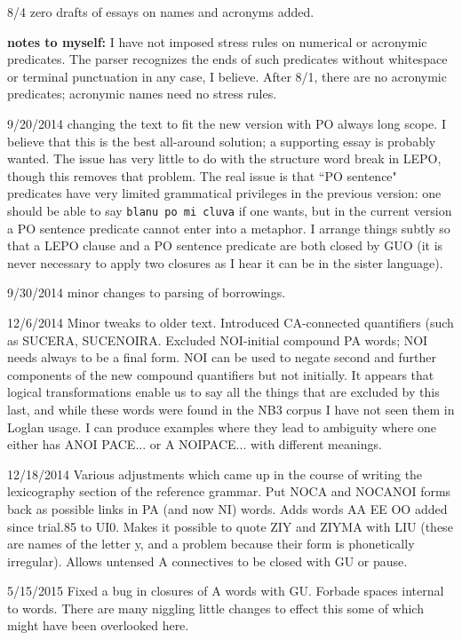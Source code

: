 \documentclass[12pt]{article}
\begin{document}
8/4 zero drafts of essays on names and acronyms added.

{\bf notes to myself:}  I have not imposed stress rules on numerical or acronymic predicates.  The parser
recognizes the ends of such predicates without whitespace or terminal punctuation in any case, I believe.  After 8/1, there are no acronymic predicates; acronymic names need no stress rules.

9/20/2014  changing the text to fit the new version with PO always long scope.   I believe that this is the best all-around solution; a supporting essay is probably wanted.  The issue
has very little to do with the structure word break in LEPO, though this removes that problem.  The real issue is that ``PO sentence" predicates have very limited grammatical privileges in the previous version:  one should be able to say {\tt blanu po mi cluva\/} if one wants, but in the current version a PO sentence predicate cannot enter into a metaphor.  I arrange things subtly so that a LEPO clause and a PO sentence predicate are both closed by GUO (it is never necessary to apply two closures as I hear it can be in the sister language).

9/30/2014 minor changes to parsing of borrowings.

12/6/2014  Minor tweaks to older text.   Introduced CA-connected quantifiers (such as SUCERA, SUCENOIRA.   Excluded NOI-initial compound PA words; NOI needs always to be a final form.  NOI can be used to negate second and further components of the new compound quantifiers but not initially.   It appears that logical transformations enable us to say all the things that are excluded by this last, and while these words were found in the NB3 corpus I have not seen them in Loglan usage.  I can produce examples where they lead to ambiguity where one either
has ANOI PACE... or A NOIPACE...  with different meanings.

12/18/2014  Various adjustments which came up in the course of writing the lexicography section of the reference grammar.  Put NOCA and NOCANOI forms back
as possible links in PA (and now NI) words.   Adds words AA EE OO added since trial.85 to UI0.  Makes it possible to quote ZIY and ZIYMA with LIU (these are names of the letter
y, and a problem because their form is phonetically irregular).   Allows untensed A connectives to be closed with GU or pause.

5/15/2015   Fixed a bug in closures of A words with GU.   Forbade spaces internal to words.   There are many niggling little changes to effect this some of which might have been overlooked here.
\end{document}
